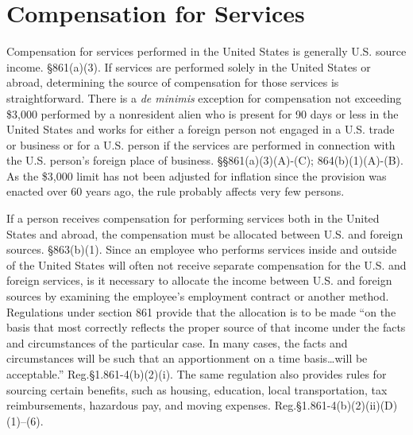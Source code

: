  \section{Compensation for Services}

Compensation for services performed in the United States is generally U.S. source income.  \S861(a)(3).  If services are performed solely in the United States or abroad, determining the source of compensation for those services is straightforward.  There is a \emph{de minimis} exception for compensation not exceeding \$3,000 performed by a nonresident alien who is present for 90 days or less in the United States and works for either a foreign person not engaged in a U.S. trade or business or for a U.S. person if the services are performed in connection with the U.S. person's foreign place of business.  \S\S 861(a)(3)(A)-(C); 864(b)(1)(A)-(B).  As the \$3,000 limit has not been adjusted for inflation since the provision was enacted over 60 years ago, the rule probably affects very few persons.  

If a person receives compensation for performing services both in the United States and abroad, the compensation must be allocated between U.S. and foreign sources. \S863(b)(1).  Since an employee who performs services inside and outside of the United States will often not receive separate compensation for the U.S. and foreign services, is it necessary to allocate the income between U.S. and foreign sources by examining the employee's employment contract or another method.  Regulations under section 861 provide that the allocation is to be made ``on the basis that most correctly reflects the proper source of that income under the facts and circumstances of the particular case.  In many cases, the facts and circumstances will be such that an apportionment on a time basis\ldots will be acceptable.''  Reg.\@ \S1.861-4(b)(2)(i).  The same regulation also provides rules for sourcing certain benefits, such as housing, education, local transportation, tax reimbursements, hazardous pay, and moving expenses.    Reg.\@ \S1.861-4(b)(2)(ii)(D)(1)--(6).

